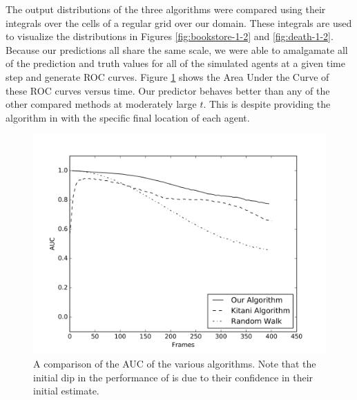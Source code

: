 \documentclass[letterpaper,10pt,conference]{ieeeconf}
\begin{document}
The output distributions of the three algorithms were compared using their integrals over the cells of a regular grid over our domain. 
These integrals are used to visualize the distributions in Figures \ref{fig:bookstore-1-2} and \ref{fig:death-1-2}.
Because our predictions all share the same scale, we were able to amalgamate all of the prediction and truth values for all of the simulated agents at a given time step and generate ROC curves. 
Figure \ref{fig:auc_vs_time} shows the Area Under the Curve of these ROC curves versus time.
Our predictor behaves better than any of the other compared methods at moderately large $t$.
This is despite providing the algorithm in \cite{Kitani2012} with the specific final location of each agent.

\begin{figure}
	\centering
	\includegraphics[width=\linewidth]{./figures/the_results.jpg}
	\caption{A comparison of the AUC of the various algorithms. Note that the initial dip in the performance of \cite{Kitani2012} is due to their confidence in their initial estimate.}
	\label{fig:auc_vs_time}
\end{figure}
\end{document}
